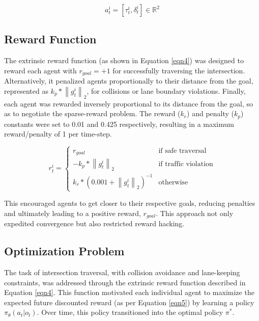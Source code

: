 \documentclass[letterpaper, 10 pt, conference]{ieeeconf}  %
\begin{document}
	\begin{equation}
	\label{eqn3}
	a_t^i = \left [ \tau_t^i, \delta_t^i \right ] \in \mathbb{R}^{2}
	\end{equation}
	
	\subsection{Reward Function}
	\label{Sub-Section: Reward Function I}
	
	The extrinsic reward function (as shown in Equation \ref{eqn4}) was designed to reward each agent with $r_{goal}=+1$ for successfully traversing the intersection. Alternatively, it penalized agents proportionally to their distance from the goal, represented as $k_p * \left \| g_{t}^{i} \right \|_{2}$, for collisions or lane boundary violations. Finally, each agent was rewarded inversely proportional to its distance from the goal, so as to negotiate the sparse-reward problem. The reward ($k_r$) and penalty ($k_p$) constants were set to 0.01 and 0.425 respectively, resulting in a maximum reward/penalty of 1 per time-step.
	
	\begin{equation}
	r_{t}^{i}  =  
	\begin{cases}
	r_{goal} & \text{if safe traversal} \\
	-k_p * \left \| g_{t}^{i} \right \|_{2} & \text{if traffic violation} \\
	k_r*(0.001+\left \| g_{t}^{i} \right \|_{2})^{-1} & \text{otherwise}
	\end{cases}
	\label{eqn4}
	\end{equation}
	
	This encouraged agents to get closer to their respective goals, reducing penalties and ultimately leading to a positive reward, $r_{goal}$. This approach not only expedited convergence but also restricted reward hacking.
	
	\subsection{Optimization Problem}
	\label{Sub-Section: Optimization Problem I}
	
	The task of intersection traversal, with collision avoidance and lane-keeping constraints, was addressed through the extrinsic reward function described in Equation \ref{eqn4}. This function motivated each individual agent to maximize the expected future discounted reward (as per Equation \ref{eqn5}) by learning a policy $\pi_\theta \left(a_t|o_t\right)$. Over time, this policy transitioned into the optimal policy $\pi^*$.
	
\end{document}
